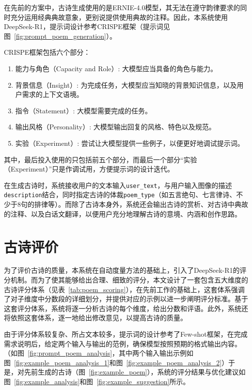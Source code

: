 在先前的方案中，古诗生成使用的是ERNIE-4.0模型，其无法在遵守韵律要求的同时充分运用经典典故意象，更别说提供使用典故的注释。因此，本系统使用DeepSeek-R1\cite{deepseek-aiDeepSeekR1IncentivizingReasoning2025}，提示词设计参考CRISPE框架（提示词见图~\ref{fig:prompt_poem_generation}）。

CRISPE框架包括六个部分：
\begin{enumerate}
  \item 能力与角色（Capacity and Role）: 大模型应当具备的角色与能力。
  \item 背景信息（Insight）: 为完成任务，大模型应当知晓的背景知识信息，以及用户需求的上下文语境。
  \item 指令（Statement）: 大模型需要完成的任务。
  \item 输出风格（Personality）: 大模型输出回复的风格、特色以及规范。
  \item 实验（Experiment）: 尝试让大模型提供一些例子，以便更好地调试提示词。
\end{enumerate}

其中，最后投入使用的只包括前五个部分，而最后一个部分“实验（Experiment）”只是作调试用，方便提示词的设计迭代。

在生成古诗时，系统接收用户的文本输入\verb|user_text|，与用户输入图像的描述\verb|description|结合，同时指定古诗的体裁\verb|poem_type|（如五言绝句、七言律诗、不少于8句的排律等）。而除了古诗本身外，系统还会输出古诗的赏析、对古诗中典故的注释、以及白话文翻译，以便用户充分地理解古诗的意境、内涵和创作思路。


\section{古诗评价}

为了评价古诗的质量，本系统在自动度量方法的基础上，引入了DeepSeek-R1的评分机制。而为了使其能够给出合理、细致的评分，本文设计了一套包含五大维度的古诗评分体系（见表~\ref{tab:poem_scoring}），在先前工作的基础上，这套体系强调了对子维度中分数段的详细划分，并提供对应的示例以进一步阐明评分标准。基于这套评分体系，系统将逐一分析古诗的每个维度，给出分数和评语。此外，系统还将依照这套体系，逐一地给出修改意见，以提高古诗的质量。

由于评分体系较复杂、所占文本较多，提示词的设计参考了Few-shot框架\cite{brownLanguageModelsAre2020}，在完成需求说明后，给定两个输入与输出的范例，确保模型按照预期的格式输出内容。（如图~\ref{fig:prompt_poem_analysis}，其中两个输入输出示例如图~\ref{fig:example_poem_analysis_1}和图~\ref{fig:example_poem_analysis_2}）于是，对先前生成的古诗（图~\ref{fig:example_poem}），系统的评分结果与优化建议如图~\ref{fig:example_analysis}和图~\ref{fig:example_suggestion}所示。

